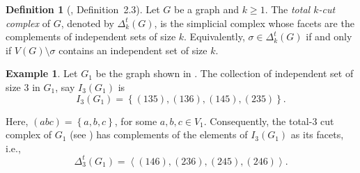 \documentclass[11pt,reqno,a4paper]{amsart}
\theoremstyle{definition}
\newtheorem{definition}{Definition}[section]
\newtheorem{example}{Example}[definition]
\theoremstyle{theorem}
\newcommand{\totalkcut}{\Delta_{k}^t}
\newcommand{\totalthreecut}{\Delta_{3}^t}
\newcommand{\lno}{\left(}
\newcommand{\rno}{\right)}
\newcommand{\lcu}{\left\{}
\newcommand{\rcu}{\right\}}
\theoremstyle{remark}
\begin{document}
\begin{definition}[\cite{bayer2024total}, Definition~2.3]\label{def:totalcutcomplex}
Let $G$ be a graph and $k \ge 1$. The \emph{total $k$-cut complex} of $G$, denoted by $\totalkcut\lno G\rno$, is the simplicial complex whose facets are the complements of independent sets of size $k$. Equivalently, $\sigma \in \totalkcut\lno G\rno$ if and only if $V(G) \setminus \sigma$ contains an independent set of size $k$.
\end{definition}

\begin{example}
    Let $G_1$ be the graph shown in .
    The collection of independent set of size 3 in $G_1$, say $I_3 \lno G_1 \rno$ is $$I_3 \lno G_1 \rno = \lcu \lno 135 \rno, \lno 136 \rno, \lno 145 \rno, \lno 235 \rno \rcu.$$
    
    Here, $\lno abc \rno = \lcu a, b,c\rcu$, for some $a,b,c \in V_1$. Consequently, the total-3 cut complex of $G_1$ (see ) has complements of the elements of $I_3 \lno G_1 \rno$ as its facets, i.e., $$\totalthreecut \lno G_1 \rno = \left\langle \lno 146 \rno, \lno 236 \rno, \lno 245 \rno, \lno 246 \rno \right\rangle.$$
\end{example}
\end{document}

